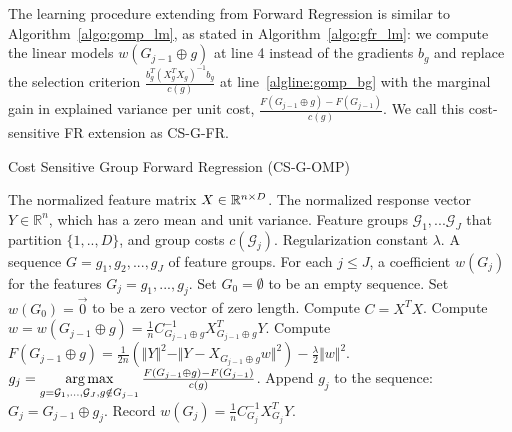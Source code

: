 The learning procedure extending from Forward Regression is similar to
Algorithm~\ref{algo:gomp_lm}, as stated in Algorithm~\ref{algo:gfr_lm}: we compute the linear models 
$w(G_{j-1} \oplus g)$ at line 4 instead of the 
gradients $b_g$ and replace the selection criterion $\frac{b_g ^T (X_{g}^TX_g)^{-1}b_g}{ c(g) }$ 
at line~\ref{algline:gomp_bg} with the marginal gain in explained 
variance per unit cost, $\frac{F(G_{j-1} \oplus g) - F(G_{j-1}) }{c(g)}$. 
We call this cost-sensitive FR extension as CS-G-FR.


\begin{algorithm}[tb]
\caption{Cost Sensitive Group Forward Regression (CS-G-OMP)}
 \label{algo:gfr_lm}
\begin{algorithmic}[1]
	 The normalized feature matrix $X \in \mathbb{R}^{n \times D}$.
 	The normalized response vector $Y \in \mathbb{R}^{n}$, which has a zero mean and unit variance. 
    Feature groups $\mathcal{G}_1, ... \mathcal{G}_J$ that partition $\{1,..,D\}$, and group costs $c(\mathcal{G}_j)$.
   Regularization constant $\lambda$.
	 A sequence $G = g_1, g_2, ..., g_{J}$ of feature groups.
   For each $j \leq J$, a coefficient  $w(G_j)$ for the features $G_j =g_1,..., g_j$. 
    \STATE Set $G_0 = \emptyset$ to be an empty sequence.
    \STATE Set $w(G_0) = \vec{0}$ to be a zero vector of zero length.
    \STATE Compute $C = X^TX$. 
        \STATE Compute $w = w(G_{j-1} \oplus g) =  \frac{1}{n}C_{G_{j-1} \oplus g}^{-1}X_{G_{j-1} \oplus g}^TY$.
        \STATE Compute $F(G_{j-1} \oplus g) = \frac{1}{2n}(\Vert Y \Vert ^2 - \Vert Y - X_{G_{j-1} \oplus g} w \Vert ^2) 
        	- \frac{\lambda}{2} \Vert w \Vert ^2$. 
    \ENDFOR
    \STATE $g_{j} = \operatorname*{arg\,max} \limits_{g = \mathcal{G}_1, ... , \mathcal{G}_J, g\notin G_{j-1}} 
	\frac{F(G_{j-1} \oplus g) - F(G_{j-1})}{c(g)}$.
   \STATE Append $g_j$ to the sequence: $G_{j} = G_{j-1} \oplus g_{j}$.
   \STATE Record $w(G_j) = \frac{1}{n}C_{G_{j}}^{-1}X_{G_{j}}^TY$.
 \ENDFOR
\end{algorithmic}
\end{algorithm}



